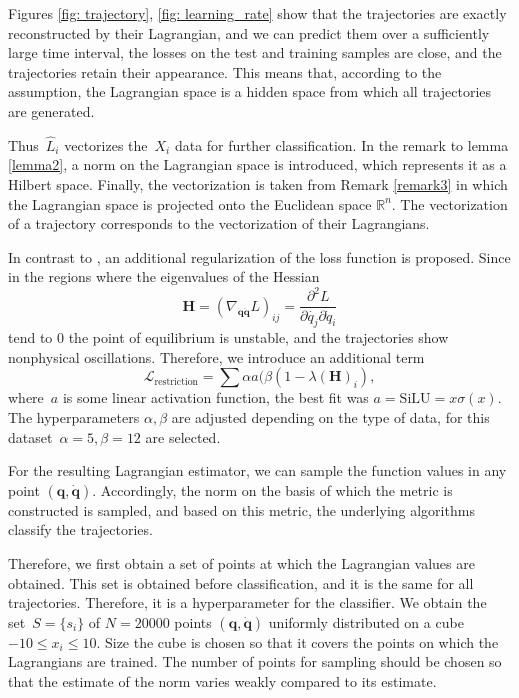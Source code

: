 \documentclass[sn-mathphys-num]{sn-jnl}
\theoremstyle{thmstylethree}
\theoremstyle{thmstyletwo}
\theoremstyle{thmstyleone}
\begin{document}
Figures \ref{fig: trajectory}, \ref{fig: learning_rate} show that the trajectories are exactly reconstructed by their Lagrangian, and we can predict them over a sufficiently large time interval, the losses on the test and training
samples are close, and the trajectories retain their appearance. This means that, according to the assumption, the Lagrangian space is a hidden space from which all trajectories are generated.

Thus~$\hat{L}_i$ vectorizes the~$X_i$ data for further classification. In the remark to lemma \ref{lemma2}, a norm
on the Lagrangian space is introduced, which represents it as a Hilbert space. Finally, the vectorization is taken from Remark \ref{remark3} in which the Lagrangian space is projected onto the Euclidean space $\mathbb{R}^n$. The vectorization of a trajectory corresponds to the vectorization of their
Lagrangians.

In contrast to \cite{article} , an additional regularization of the loss function is proposed.
Since in the regions where the eigenvalues of the Hessian
\[
\mathbf{H} = \left(\nabla_{\dot{\mathbf{q}}\dot{\mathbf{q}}} L\right)_{i j}=\frac{\partial^{2} L}{\partial \dot{q_{j}} \partial \dot{q}_{i}}
\]
tend to 0 the point of equilibrium is unstable, and the trajectories show nonphysical oscillations. Therefore, we introduce an additional term 
\[
\mathcal{L}_\text{restriction} =  \sum \alpha a(\beta(1 - \lambda(\mathbf{H})_i), 
\]
where~$a$ is some linear activation function, the best fit was %
$a = \text{SiLU} = x\sigma(x)$. The hyperparameters $\alpha, \beta$ are adjusted depending on the type of data, for this dataset~$\alpha = 5, \beta = 12$ are selected.

For the resulting Lagrangian estimator, we can sample the function values in any point $(\mathbf{q},\dot{\mathbf{q}})$. Accordingly, the norm on the basis of which the metric is constructed is sampled, and based on this metric, the underlying algorithms classify the trajectories.

Therefore, we first obtain a set of points at which the Lagrangian values are obtained. This
set is obtained before classification, and it is the same for all trajectories. Therefore, it is a
hyperparameter for the classifier. We obtain the set~$S = \{s_i\}$ of $N = 20000$ points $(\mathbf{q},\dot{\mathbf{q}})$ uniformly distributed on a cube~$-10 \le {x_i} \le 10$. Size
the cube is chosen so that it covers the points on which the Lagrangians are trained. The number of points for sampling should be chosen so that the estimate of the norm varies weakly
compared to its estimate.
\end{document}
